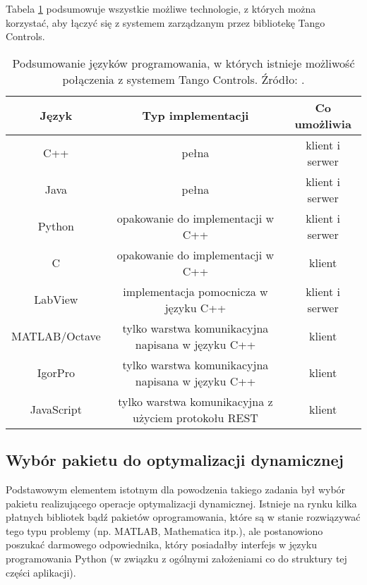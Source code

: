 
Tabela \ref{tab:tango-implementations} podsumowuje wszystkie możliwe technologie, z których można korzystać, aby łączyć się z systemem zarządzanym przez bibliotekę Tango Controls.

\begin{table}[t]
    \label{tab:tango-implementations}
    \centering
    \begin{tabular}{|c|c|c|}
        \hline 
        \textbf{Język} & \textbf{Typ implementacji} &\textbf{Co umożliwia} \\ 
        \hline 
        C++ & pełna & klient i serwer \\ 
        \hline 
        Java & pełna & klient i serwer \\ 
        \hline 
        Python & opakowanie do implementacji w C++ & klient i serwer \\ 
        \hline 
        C & opakowanie do implementacji w C++ & klient \\ 
        \hline 
        LabView & implementacja pomocnicza w języku C++ & klient i serwer \\ 
        \hline 
        MATLAB/Octave & tylko warstwa komunikacyjna napisana w języku C++ & klient \\ 
        \hline 
        IgorPro & tylko warstwa komunikacyjna napisana w języku C++ & klient \\ 
        \hline 
        JavaScript & tylko warstwa komunikacyjna z użyciem protokołu REST & klient \\ 
        \hline 
    \end{tabular}
    \caption{Podsumowanie języków programowania, w których istnieje możliwość połączenia z systemem Tango Controls. Źródło: \cite{TangoWebsite}.}
\end{table}

\subsection{Wybór pakietu do optymalizacji dynamicznej}
\label{sub:czesc-wyzsza-wybor}

Podstawowym elementem istotnym dla powodzenia takiego zadania był wybór pakietu realizującego operacje optymalizacji dynamicznej. Istnieje na rynku kilka płatnych bibliotek bądź pakietów oprogramowania, które są w stanie rozwiązywać tego typu problemy (np. MATLAB, Mathematica itp.), ale postanowiono poszukać darmowego odpowiednika, który posiadałby interfejs w języku programowania Python (w związku z ogólnymi założeniami co do struktury tej części aplikacji).


